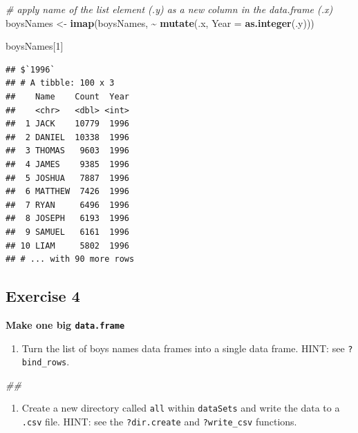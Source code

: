 \documentclass[
]{book}
\newenvironment{Shaded}{\begin{snugshade}}{\end{snugshade}}
\newcommand{\CommentTok}[1]{\textcolor[rgb]{0.56,0.35,0.01}{\textit{#1}}}
\newcommand{\DataTypeTok}[1]{\textcolor[rgb]{0.13,0.29,0.53}{#1}}
\newcommand{\DecValTok}[1]{\textcolor[rgb]{0.00,0.00,0.81}{#1}}
\newcommand{\KeywordTok}[1]{\textcolor[rgb]{0.13,0.29,0.53}{\textbf{#1}}}
\newcommand{\NormalTok}[1]{#1}
\newcommand{\OperatorTok}[1]{\textcolor[rgb]{0.81,0.36,0.00}{\textbf{#1}}}
\newcommand{\StringTok}[1]{\textcolor[rgb]{0.31,0.60,0.02}{#1}}
\providecommand{\tightlist}{%
  \setlength{\itemsep}{0pt}\setlength{\parskip}{0pt}}
\begin{document}
\begin{Shaded}
\begin{Highlighting}[]
\CommentTok{\# apply name of the list element (.y) as a new column in the data.frame (.x)}
\NormalTok{boysNames \textless{}{-}}\StringTok{ }\KeywordTok{imap}\NormalTok{(boysNames, }\OperatorTok{\textasciitilde{}}\StringTok{ }\KeywordTok{mutate}\NormalTok{(.x, }\DataTypeTok{Year =} \KeywordTok{as.integer}\NormalTok{(.y)))}

\NormalTok{boysNames[}\DecValTok{1}\NormalTok{]}
\end{Highlighting}
\end{Shaded}

\begin{verbatim}
## $`1996`
## # A tibble: 100 x 3
##    Name    Count  Year
##    <chr>   <dbl> <int>
##  1 JACK    10779  1996
##  2 DANIEL  10338  1996
##  3 THOMAS   9603  1996
##  4 JAMES    9385  1996
##  5 JOSHUA   7887  1996
##  6 MATTHEW  7426  1996
##  7 RYAN     6496  1996
##  8 JOSEPH   6193  1996
##  9 SAMUEL   6161  1996
## 10 LIAM     5802  1996
## # ... with 90 more rows
\end{verbatim}

\hypertarget{exercise-4-1}{%
\subsection{Exercise 4}\label{exercise-4-1}}

\textbf{Make one big \texttt{data.frame}}

\begin{enumerate}
\def\labelenumi{\arabic{enumi}.}
\tightlist
\item
  Turn the list of boys names data frames into a single data frame. HINT: see \texttt{?bind\_rows}.
\end{enumerate}

\begin{Shaded}
\begin{Highlighting}[]
\CommentTok{\#\# }
\end{Highlighting}
\end{Shaded}

\begin{enumerate}
\def\labelenumi{\arabic{enumi}.}
\setcounter{enumi}{1}
\tightlist
\item
  Create a new directory called \texttt{all} within \texttt{dataSets} and write the data to a \texttt{.csv} file.
  HINT: see the \texttt{?dir.create} and \texttt{?write\_csv} functions.
\end{enumerate}
\end{document}
